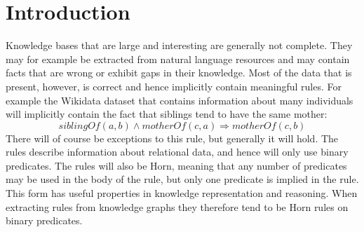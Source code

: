 \chapter{Introduction}

Knowledge bases that are large and interesting are generally not complete. They may for example be extracted from natural language resources and may contain facts that are wrong or exhibit gaps in their knowledge. Most of the data that is present, however, is correct and hence implicitly contain meaningful rules. For example the Wikidata dataset that contains information about many individuals will implicitly contain the fact that siblings tend to have the same mother:
\[siblingOf(a, b) \wedge motherOf(c, a) \Rightarrow motherOf(c, b)\]
There will of course be exceptions to this rule, but generally it will hold. The rules describe information about relational data, and hence will only use binary predicates. The rules will also be Horn, meaning that any number of predicates may be used in the body of the rule, but only one predicate is implied in the rule. This form has useful properties in knowledge representation and reasoning. When extracting rules from knowledge graphs they therefore tend to be Horn rules on binary predicates.